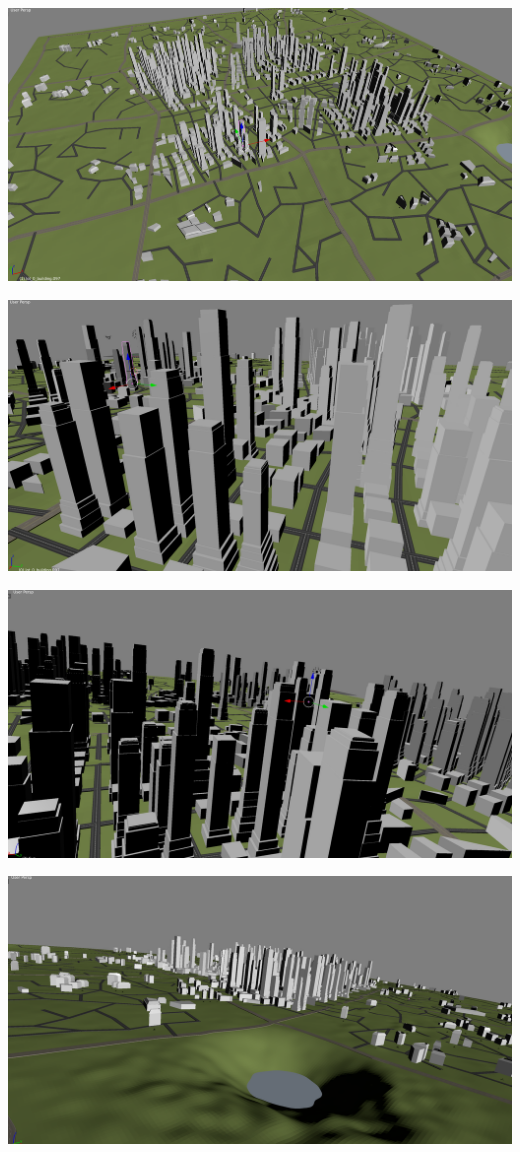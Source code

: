 \documentclass[a4paper,12pt]{scrartcl}
\begin{document}
\center
\includegraphics[width=\textheight,angle=90]{view1.png}

\center
\includegraphics[width=\textheight,angle=90]{view2.png}

\center
\includegraphics[width=\textheight,angle=90]{view4.png}

\center
\includegraphics[width=\textheight,angle=90]{view5.png}




\nocite{*}

\end{document}
